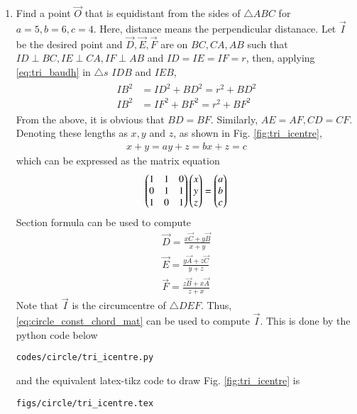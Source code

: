 \renewcommand{\theequation}{\theenumi}
\begin{enumerate}[label=\arabic*.,ref=\thesubsection.\theenumi]

\item Find a point $\vec{O}$ that is equidistant from the sides of $\triangle ABC$ for $a = 5, b = 6, c = 4$. Here, distance means the perpendicular distanace.
%
\solution Let $\vec{I}$ be the desired point and  $\vec{D}, \vec{E}, \vec{F}$ are on  $BC, CA, AB$ such that $ID \perp BC, IE \perp CA, IF \perp AB$ and $ID = IE = IF = r$, then, applying \eqref{eq:tri_baudh} in $\triangle s$ $IDB$ and $IEB$,
\begin{align}
\label{eq:tri_icentre_baudhd}
\begin{split}
IB^2 &= ID^2+BD^2 = r^2 + BD^2 
\\
IB^2 &= IF^2+BF^2 = r^2 + BF^2
\end{split}
\end{align}
From the above, it is obvious that $BD = BF$. Similarly, $AE = AF, CD = CF$.  Denoting these lengths as $x, y$ and $z$, as shown in Fig. \ref{fig:tri_icentre},
%
\begin{align}
x + y = a
y+z = b
x + z = c
\end{align}
%
which can be expressed as the matrix equation
%
\begin{align}
\begin{pmatrix}
1 & 1 & 0
\\
0 & 1 & 1
\\
1 & 0 & 1
\end{pmatrix}
\begin{pmatrix}x \\ y \\ z\end{pmatrix}
=
\begin{pmatrix}a\\b\\c\end{pmatrix}
\label{eq:tri_icentre_mat}
\end{align}
%
Section formula can be used to compute 
\begin{align}
\vec{D} = \frac{x\vec{C}+y\vec{B}}{x+y}
\\
\vec{E} = \frac{y\vec{A}+z\vec{C}}{y+z}
\\
\vec{F} = \frac{z\vec{B}+x\vec{A}}{z+x}
\end{align}
%
Note that $\vec{I}$ is the circumcentre of $\triangle DEF$.  Thus, \eqref{eq:circle_const_chord_mat} can be used to compute $\vec{I}$.  
%
This is done by the python code below
%
\begin{lstlisting}
codes/circle/tri_icentre.py
\end{lstlisting}
%
and the equivalent latex-tikz code to draw Fig. \ref{fig:tri_icentre} is
%
\begin{lstlisting}
figs/circle/tri_icentre.tex
\end{lstlisting}
%
\begin{figure}[!ht]
	\begin{center}
		

\end{center}
\end{figure}
\end{enumerate}
